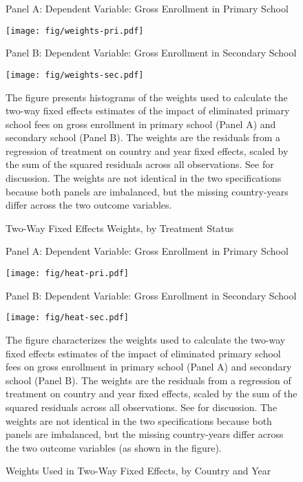 \documentclass[11pt]{article}
\begin{document}
\newpage
\singlespacing

 

\newpage
\begin{figure}
\begin{center}	
\caption{Two-Way Fixed Effects Weights, by Treatment Status} \label{fig:weights}

\medskip
\medskip

Panel A:  Dependent Variable:  Gross Enrollment in Primary School

\texttt{[image: fig/weights-pri.pdf]}

\medskip

Panel B:  Dependent Variable:  Gross Enrollment in Secondary School

\texttt{[image: fig/weights-sec.pdf]}

\end{center}

\footnotesize{The figure presents histograms of the weights used to calculate the two-way fixed effects estimates of the impact of eliminated primary school fees on gross enrollment in primary school (Panel A) and secondary school (Panel B).  The weights are the residuals from a regression of treatment on country and year fixed effects, scaled by the sum of the squared residuals across all observations.  See  for discussion.  The weights are not identical in the two specifications because both panels are imbalanced, but the missing country-years differ across the two outcome variables.}
\end{figure}

\begin{figure}
\begin{center}	
\caption{Weights Used in Two-Way Fixed Effects, by Country and Year} \label{fig:heatmap}

\medskip
\medskip

Panel A:  Dependent Variable:  Gross Enrollment in Primary School

\texttt{[image: fig/heat-pri.pdf]}

\medskip

Panel B:  Dependent Variable:  Gross Enrollment in Secondary School

\texttt{[image: fig/heat-sec.pdf]}

\end{center}

\footnotesize{The figure characterizes the weights used to calculate the two-way fixed effects estimates of the impact of eliminated primary school fees on gross enrollment in primary school (Panel A) and secondary school (Panel B).  The weights are the residuals from a regression of treatment on country and year fixed effects, scaled by the sum of the squared residuals across all observations.  See  for discussion.  The weights are not identical in the two specifications because both panels are imbalanced, but the missing country-years differ across the two outcome variables (as shown in the figure).}

\end{figure}
\end{document}
